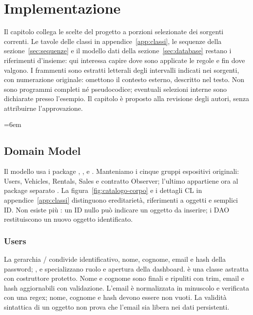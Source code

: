 \chapter{Implementazione}\label{ch:implementazione}
Il capitolo collega le scelte del progetto a porzioni selezionate dei sorgenti
correnti. Le tavole delle classi in appendice~\ref{app:classi}, le sequenze
della sezione~\ref{sec:sequenze} e il modello dati della
sezione~\ref{sec:database} restano i riferimenti d'insieme: qui interessa
capire dove sono applicate le regole e fin dove valgono.
I frammenti sono estratti letterali degli intervalli indicati nei sorgenti,
con numerazione originale: omettono il contesto esterno, descritto nel testo.
Non sono programmi completi né pseudocodice; eventuali selezioni interne
sono dichiarate presso l'esempio. Il capitolo è proposto alla revisione
degli autori, senza attribuirne l'approvazione.

\begingroup
\setcounter{secnumdepth}{3}
\emergencystretch=6em
\renewcommand{\lstlistingname}{Frammento}
\section{Domain Model}\label{sec:impl-dominio}
Il modello usa i package , ,
 e . Manteniamo i cinque gruppi
espositivi originali: Users, Vehicles, Rentals, Sales e contratto Observer;
l'ultimo appartiene ora al package separato .
La figura~\ref{fig:catalogo-corpo} e i dettagli CL in
appendice~\ref{app:classi} distinguono ereditarietà, riferimenti a oggetti
e semplici ID. Non esiste più : un ID nullo può
indicare un oggetto da inserire; i DAO restituiscono un nuovo oggetto identificato.

\subsection{Users}
La gerarchia / condivide identificativo,
nome, cognome, email e hash della password; , 
e  specializzano ruolo e apertura della dashboard.
 è una classe astratta con costruttore protetto.
Nome e cognome sono finali e ripuliti con trim, email e hash aggiornabili
con validazione. L'email è normalizzata in minuscolo e verificata con una
regex; nome, cognome e hash devono essere non vuoti. La validità sintattica
di un oggetto non prova che l'email sia libera nei dati persistenti.

